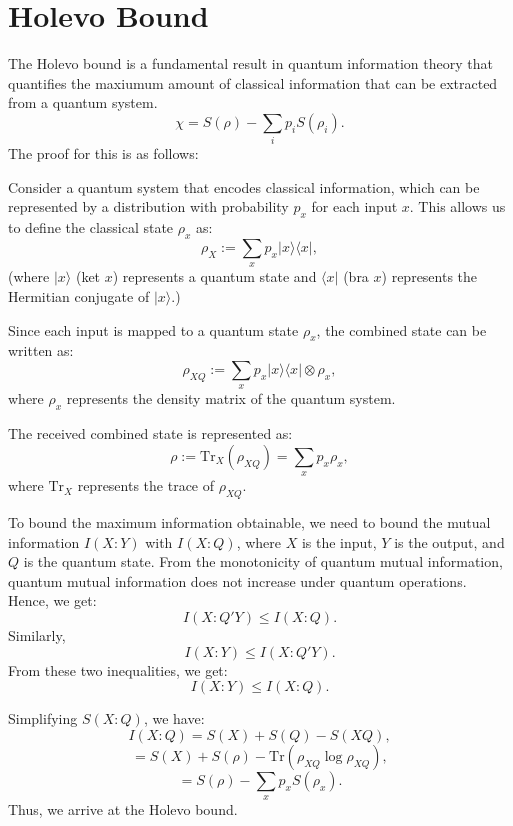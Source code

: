 \section{Holevo Bound}

The Holevo bound is a fundamental result in quantum information theory that quantifies the maxiumum amount of classical information that can be extracted from a quantum system.
\[
\chi = S(\rho) - \sum_i p_i S(\rho_i).
\]
The proof for this is as follows:

Consider a quantum system that encodes classical information, which can be represented by a distribution with probability $p_x$ for each input $x$. This allows us to define the classical state $\rho_x$ as:
\[
\rho_X := \sum_x p_x \lvert x \rangle \langle x \rvert,
\]
(where $\lvert x \rangle$ (ket $x$) represents a quantum state and $\langle x \rvert$ (bra $x$) represents the Hermitian conjugate of $\lvert x \rangle$.)

Since each input is mapped to a quantum state $\rho_x$, the combined state can be written as:
\[
\rho_{XQ} := \sum_x p_x \lvert x \rangle \langle x \rvert \otimes \rho_x,
\]
where $\rho_x$ represents the density matrix of the quantum system.

The received combined state is represented as:
\[
\rho := \text{Tr}_X (\rho_{XQ}) = \sum_x p_x \rho_x,
\]
where $\text{Tr}_X$ represents the trace of $\rho_{XQ}$.

To bound the maximum information obtainable, we need to bound the mutual information $I(X : Y)$ with $I(X : Q)$, where $X$ is the input, $Y$ is the output, and $Q$ is the quantum state. From the monotonicity of quantum mutual information, quantum mutual information does not increase under quantum operations. Hence, we get:
\[
I(X : Q'Y) \leq I(X : Q).
\]
Similarly,
\[
I(X : Y) \leq I(X : Q'Y).
\]
From these two inequalities, we get:
\[
I(X : Y) \leq I(X : Q).
\]

Simplifying $S(X : Q)$, we have:
\[
I(X : Q) = S(X) + S(Q) - S(XQ),
\]
\[
= S(X) + S(\rho) - \text{Tr}(\rho_{XQ} \log \rho_{XQ}),
\]
\[
= S(\rho) - \sum_x p_x S(\rho_x).
\]
Thus, we arrive at the Holevo bound.
